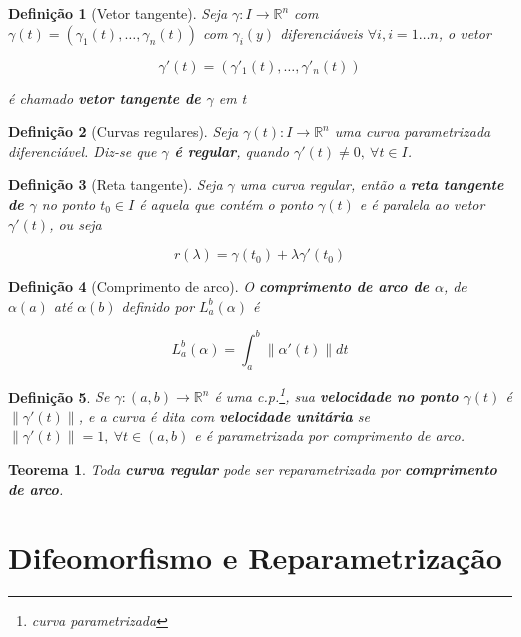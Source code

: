 \documentclass{article}
\newtheorem{theorem}{Teorema}
\newtheorem{definition}{Definição}
\begin{document}
\begin{definition}[Vetor tangente]
Seja $\gamma: I \rightarrow \mathbb{R}^n$ com $\gamma(t) = (\gamma_1 (t), \ldots, \gamma_n (t))$ com $\gamma_i (y)$ diferenciáveis $\forall i, i = 1 \ldots n$, o vetor

$$\gamma'(t) = (\gamma'_1 (t), \ldots, \gamma'_n (t))$$

é chamado \textbf{vetor tangente de $\gamma$} em t
\end{definition}

\begin{definition}[Curvas regulares]
Seja $\gamma (t): I \rightarrow \mathbb{R}^n$ uma curva parametrizada diferenciável. Diz-se que \textbf{$\gamma$ é regular}, quando $\gamma'(t) \neq 0,\ \forall t \in I$. 
\end{definition}

\begin{definition}[Reta tangente]
Seja $\gamma$ uma curva regular, então a \textbf{reta tangente de $\gamma$} no ponto $t_0 \in I$ é aquela que contém o ponto $\gamma(t)$ e é paralela ao vetor $\gamma'(t)$, ou seja

$$r(\lambda) = \gamma(t_0) + \lambda \gamma'(t_0)$$
\end{definition}

\begin{definition}[Comprimento de arco]
O \textbf{comprimento de arco de $\alpha$}, de $\alpha(a)$ até $\alpha(b)$ definido por $L_a^b (\alpha)$ é  

$$L_a^b (\alpha) = \int_a^b \| \alpha'(t) \| d t$$
\end{definition}

\begin{definition}
Se $\gamma: (a, b) \rightarrow \mathbb{R}^n$ é uma c.p.\footnote{curva parametrizada}, sua \textbf{velocidade no ponto} $\gamma(t)$ é $\| \gamma'(t) \|$, e a curva é dita com \textbf{velocidade unitária} se $\| \gamma'(t) \| = 1,\ \forall t \in (a, b)$ e é parametrizada por comprimento de arco.
\end{definition}

\begin{theorem}
Toda \textbf{curva regular} pode ser reparametrizada por \textbf{comprimento de arco}.
\end{theorem}

\section*{Difeomorfismo e Reparametrização}
\label{s2}
\end{document}
